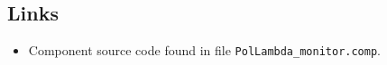 \subsection*{Links}
\begin{itemize}
  \item Component source code found in file \texttt{PolLambda\_monitor.comp}.
\end{itemize}
